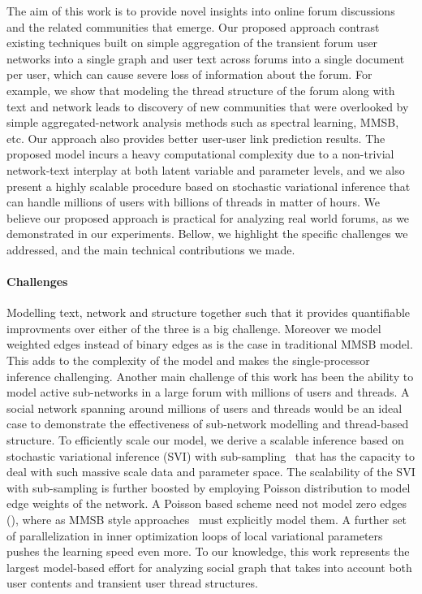 \documentclass{sig-alternate}
\begin{document}
The aim of this work is to provide novel insights into online forum discussions
and the related communities that emerge. Our proposed approach contrast existing techniques built on  
simple aggregation of the transient forum user networks into a single graph and user 
text across forums into a single document per user, which can cause severe loss of information about the forum. 
For example, we show that modeling the thread structure of the forum along with text and network 
leads to discovery of new communities that were overlooked by simple
aggregated-network analysis methods such as spectral learning, MMSB, etc. Our approach also 
provides better user-user link prediction results. 
The proposed model incurs a heavy computational complexity due to a non-trivial network-text interplay at both latent variable and parameter levels, and we also present a highly scalable procedure based on stochastic variational inference that can handle millions of users with billions of threads in matter of hours. We believe our proposed approach is practical for analyzing real world forums, as we demonstrated in our experiments. Bellow, we highlight the specific challenges we addressed, and the main technical contributions we made.

\vspace*{-0.5\baselineskip}
\paragraph{Challenges} Modelling text, network and 
structure together such that it provides
quantifiable improvments over either of the three is a big challenge.
Moreover we model weighted edges instead of binary edges 
as is the case in traditional MMSB model. This adds to the 
complexity of the model and makes the single-processor inference challenging.
Another main challenge of this work has been the ability to model
active sub-networks in a large forum with millions of users and
threads. A social network spanning around millions of users and threads would 
be an ideal case to demonstrate the effectiveness of sub-network
modelling and thread-based structure.
To efficiently scale our model, we derive a scalable inference based on
stochastic variational inference (SVI) with sub-sampling~\cite{Hoffman:2013:SVI} 
that has the capacity to deal with such massive scale data and parameter space.
 The scalability of the SVI
with sub-sampling is further boosted by employing Poisson distribution 
to model edge weights of
the network. A Poisson based scheme need not model zero edges
(\cite{Kerrer:Newman}), where as MMSB style approaches~\cite{Airoldi:2008:MMS:1390681.1442798}
 must explicitly model them.
A further set of
parallelization in inner optimization loops of local variational parameters
pushes the learning speed even more. To our knowledge, this work represents the largest 
model-based effort for analyzing social graph that takes into account both user contents and transient user thread structures. 
\end{document}
